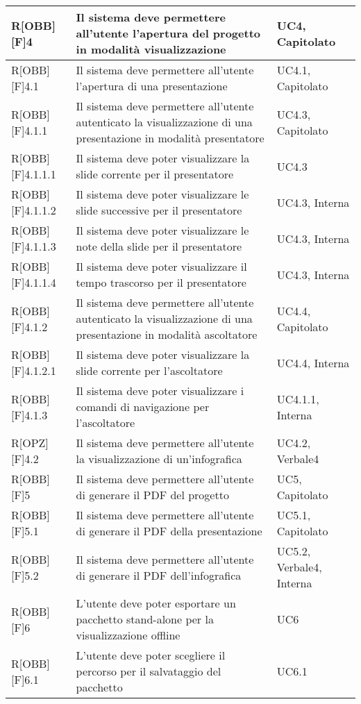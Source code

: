 	\begin{table}[h]
		\begin{tabular}{|p{}|p{}|p{}|}
			\midrule

			R[OBB][F]4 & Il sistema deve permettere all'utente l'apertura del progetto in modalità visualizzazione & UC4, Capitolato \\ \midrule
			R[OBB][F]4.1 & Il sistema deve permettere all'utente l'apertura di una presentazione & UC4.1, Capitolato \\ \midrule
			R[OBB][F]4.1.1 & Il sistema deve permettere all'utente autenticato la visualizzazione di una presentazione in modalità presentatore & UC4.3, Capitolato \\ \midrule
			R[OBB][F]4.1.1.1 & Il sistema deve poter visualizzare la slide corrente per il presentatore & UC4.3 \\ \midrule
			R[OBB][F]4.1.1.2 & Il sistema deve poter visualizzare le slide successive per il presentatore & UC4.3, Interna \\ \midrule
			R[OBB][F]4.1.1.3 & Il sistema deve poter visualizzare le note della slide per il presentatore & UC4.3, Interna \\ \midrule
			R[OBB][F]4.1.1.4 & Il sistema deve poter visualizzare il tempo trascorso per il presentatore & UC4.3, Interna \\ \midrule
			R[OBB][F]4.1.2 & Il sistema deve permettere all'utente autenticato la visualizzazione di una presentazione in modalità ascoltatore & UC4.4, Capitolato \\ \midrule
			R[OBB][F]4.1.2.1 & Il sistema deve poter visualizzare la slide corrente per l'ascoltatore & UC4.4, Interna \\ \midrule
			R[OBB][F]4.1.3 & Il sistema deve poter visualizzare i comandi di navigazione per l'ascoltatore & UC4.1.1, Interna \\ \midrule
			R[OPZ][F]4.2 & Il sistema deve permettere all'utente la visualizzazione di un'\gls{infografica} & UC4.2, Verbale4 \\ \midrule
			R[OBB][F]5 & Il sistema deve permettere all'utente di generare il PDF del progetto & UC5, Capitolato \\ \midrule
			R[OBB][F]5.1 & Il sistema deve permettere all'utente di generare il PDF della presentazione & UC5.1, Capitolato \\ \midrule
			R[OBB][F]5.2 & Il sistema deve permettere all'utente di generare il PDF dell'\gls{infografica} & UC5.2, Verbale4, Interna \\ \midrule
			R[OBB][F]6 & L'utente deve poter esportare un pacchetto stand-alone per la visualizzazione offline & UC6 \\ \midrule
			R[OBB][F]6.1 & L'utente deve poter scegliere il percorso per il salvataggio del pacchetto & UC6.1 \\ \midrule

		\end{tabular}
	\end{table}
	\newpage


